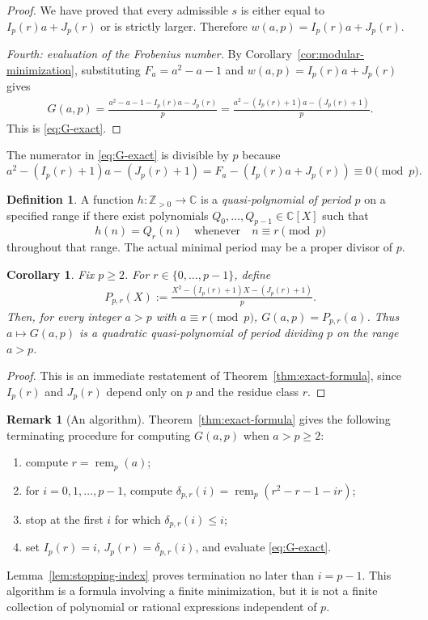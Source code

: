 \documentclass[reqno, 12pt]{article}
\numberwithin{equation}{section}
\newtheorem{corollary}[theorem]{Corollary}
\theoremstyle{definition}
\newtheorem{definition}[theorem]{Definition}
\newtheorem{remark}[theorem]{Remark}
\newcommand{\ZZ}{\mathbb{Z}}
\newcommand{\CC}{\mathbb{C}}
\newcommand{\remp}{\operatorname{rem}}
\begin{document}
\begin{proof}
We have proved that every admissible $s$ is either equal to $I_p(r)a+J_p(r)$ or is
strictly larger.  Therefore $w(a,p)=I_p(r)a+J_p(r)$.

\smallskip
\noindent\emph{Fourth: evaluation of the Frobenius number.}
By Corollary~\ref{cor:modular-minimization}, substituting $F_a=a^2-a-1$ and $w(a,p)=I_p(r)a+J_p(r)$ gives
\begin{align*}
   G(a,p)=\frac{a^2-a-1-I_p(r)a-J_p(r)}{p}=\frac{a^2-(I_p(r)+1)a-(J_p(r)+1)}{p}.
\end{align*}
This is \cref{eq:G-exact}.
\end{proof}

The numerator in \cref{eq:G-exact} is divisible by $p$ because
\[ a^2-(I_p(r)+1)a-(J_p(r)+1)=F_a-(I_p(r)a+J_p(r))\equiv0\pmod p.\]


\begin{definition}\label{def:quasipolynomial}
A function $h:\ZZ_{>0}\to\CC$ is a \emph{quasi-polynomial of period $p$} on a specified range if there exist polynomials
$Q_0,\ldots,Q_{p-1}\in\CC[X]$ such that
\[h(n)=Q_r(n)\quad\text{whenever}\quad n\equiv r\pmod p
\]
throughout that range. The actual minimal period may be a proper divisor of $p$.
\end{definition}

\begin{corollary}\label{cor:quasipolynomial}
Fix $p\ge2$.  For $r\in\{0,\ldots,p-1\}$, define
\begin{align*}
P_{p,r}(X):=\frac{X^2-(I_p(r)+1)X-(J_p(r)+1)}{p}.
\end{align*}
Then, for every integer $a>p$ with $a\equiv r\pmod p$, $G(a,p)=P_{p,r}(a)$.
Thus $a\mapsto G(a,p)$ is a quadratic quasi-polynomial of period dividing $p$ on the range $a>p$.
\end{corollary}
\begin{proof}
This is an immediate restatement of Theorem~\ref{thm:exact-formula}, since $I_p(r)$ and $J_p(r)$ depend only on $p$ and the residue class $r$.
\end{proof}

\begin{remark}[An algorithm]\label{rem:algorithm}
Theorem~\ref{thm:exact-formula} gives the following terminating procedure for computing $G(a,p)$ when $a>p\ge2$:
\begin{enumerate}
\item compute $r=\remp_p(a)$;
\item for $i=0,1,\ldots,p-1$, compute $\delta_{p,r}(i)=\remp_p(r^2-r-1-ir)$;
\item stop at the first $i$ for which $\delta_{p,r}(i)\le i$;
\item set $I_p(r)=i$, $J_p(r)=\delta_{p,r}(i)$, and evaluate \cref{eq:G-exact}.
\end{enumerate}
Lemma~\ref{lem:stopping-index} proves termination no later than $i=p-1$.
This algorithm is a formula involving a finite minimization, but it is not a finite collection of polynomial or rational expressions independent of $p$.
\end{remark}
\end{document}
